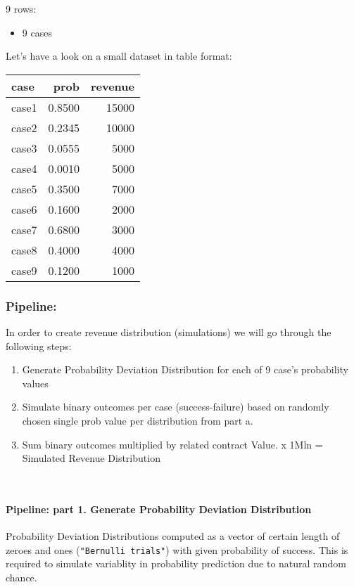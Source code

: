 \documentclass[]{article}
\providecommand{\tightlist}{%
  \setlength{\itemsep}{0pt}\setlength{\parskip}{0pt}}
\let\oldparagraph\paragraph
\renewcommand{\paragraph}[1]{\oldparagraph{#1}\mbox{}}
\begin{document}
9 rows:

\begin{itemize}
\tightlist
\item
  9 cases
\end{itemize}

Let's have a look on a small dataset in table format:

\begin{longtable}[]{@{}lrr@{}}
\toprule
case & prob & revenue\tabularnewline
\midrule
\endhead
case1 & 0.8500 & 15000\tabularnewline
case2 & 0.2345 & 10000\tabularnewline
case3 & 0.0555 & 5000\tabularnewline
case4 & 0.0010 & 5000\tabularnewline
case5 & 0.3500 & 7000\tabularnewline
case6 & 0.1600 & 2000\tabularnewline
case7 & 0.6800 & 3000\tabularnewline
case8 & 0.4000 & 4000\tabularnewline
case9 & 0.1200 & 1000\tabularnewline
\bottomrule
\end{longtable}

\hypertarget{pipeline}{%
\subsubsection{Pipeline:}\label{pipeline}}

In order to create revenue distribution (simulations) we will go through
the following steps:

\begin{enumerate}
\def\labelenumi{\alph{enumi})}
\tightlist
\item
  Generate Probability Deviation Distribution for each of 9 case's
  probability values
\item
  Simulate binary outcomes per case (success-failure) based on randomly
  chosen single prob value per distribution from part a.
\item
  Sum binary outcomes multiplied by related contract Value. x 1Mln =
  Simulated Revenue Distribution
\end{enumerate}

~

\hypertarget{pipeline-part-1.-generate-probability-deviation-distribution}{%
\paragraph{Pipeline: part 1. Generate Probability Deviation
Distribution}\label{pipeline-part-1.-generate-probability-deviation-distribution}}

Probability Deviation Distributions computed as a vector of certain
length of zeroes and ones (\texttt{"Bernulli\ trials"}) with given
probability of success. This is required to simulate variablity in
probability prediction due to natural random chance.
\end{document}
